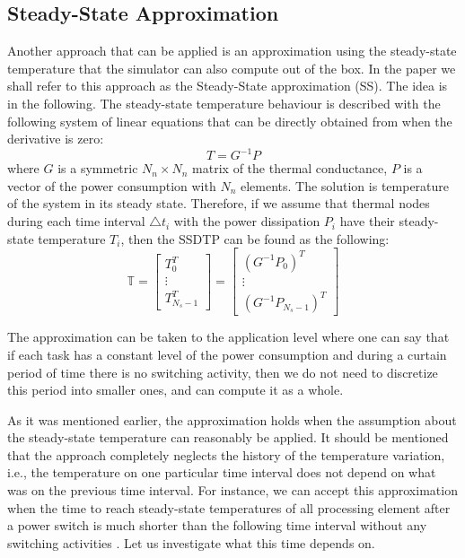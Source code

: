 \subsection{Steady-State Approximation}
Another approach that can be applied is an approximation using the steady-state temperature \cite{huang2009} that the simulator can also compute out of the box. In the paper we shall refer to this approach as the Steady-State approximation (SS). The idea is in the following. The steady-state temperature behaviour is described with the following system of linear equations that can be directly obtained from  when the derivative is zero:
\[
  T = G^{-1} P
\]
where $G$ is a symmetric $N_n \times N_n$ matrix of the thermal conductance, $P$ is a vector of the power consumption with $N_n$ elements. The solution is temperature of the system in its steady state. Therefore, if we assume that thermal nodes during each time interval $\triangle t_i$ with the power dissipation $P_i$ have their steady-state temperature $T_i$, then the SSDTP can be found as the following:
\begin{equation*}
  \mathbb{T} = \left[
    \begin{array}{c}
      T_0^T \\
      \vdots \\
      T_{N_s - 1}^T
    \end{array}
  \right] = \left[
    \begin{array}{c}
      (G^{-1} P_0)^T \\
      \vdots \\
      (G^{-1} P_{N_s - 1})^T
    \end{array}
  \right]
\end{equation*}

The approximation can be taken to the application level where one can say that if each task has a constant level of the power consumption and during a curtain period of time there is no switching activity, then we do not need to discretize this period into smaller ones, and can compute it as a whole.

As it was mentioned earlier, the approximation holds when the assumption about the steady-state temperature can reasonably be applied. It should be mentioned that the approach completely neglects the history of the temperature variation, i.e., the temperature on one particular time interval does not depend on what was on the previous time interval. For instance, we can accept this approximation when the time to reach steady-state temperatures of all processing element after a power switch is much shorter than the following time interval without any switching activities \cite{huang2009}. Let us investigate what this time depends on.


